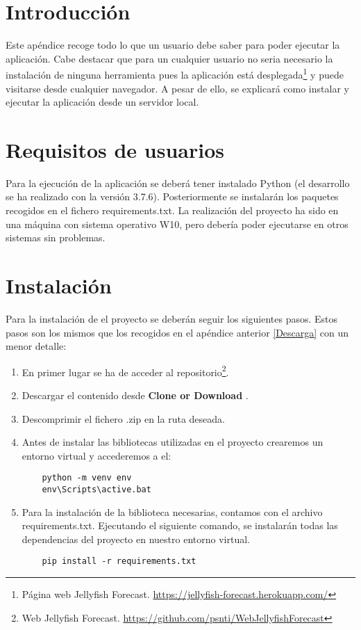 
\section{Introducción}

Este apéndice recoge todo lo que un usuario debe saber para poder ejecutar la aplicación. Cabe destacar que para un cualquier usuario no seria necesario la instalación de ninguna herramienta pues la aplicación está desplegada\footnote{Página web Jellyfish Forecast. \url{https://jellyfish-forecast.herokuapp.com/}} y puede visitarse desde cualquier navegador. A pesar de ello, se explicará como instalar y ejecutar la aplicación desde un servidor local.

\section{Requisitos de usuarios}
Para la ejecución de la aplicación se deberá tener instalado Python (el desarrollo se ha realizado con la versión 3.7.6). Posteriormente se instalarán los paquetes recogidos en el fichero requirements.txt. La realización del proyecto ha sido en una máquina con sistema operativo W10, pero debería poder ejecutarse en otros sistemas sin problemas.

\section{Instalación}

Para la instalación de el proyecto se deberán seguir los siguientes pasos. Estos pasos son los mismos que los recogidos en el apéndice anterior \ref{Descarga} con un menor detalle:

\begin{enumerate}
	\item En primer lugar se ha de acceder al repositorio\footnote{Web Jellyfish Forecast. \url{https://github.com/psnti/WebJellyfishForecast}}.
	\item Descargar el contenido desde \textbf{Clone or Download}
	\label{clone}.
	\item Descomprimir el fichero .zip en la ruta deseada.
	\item Antes de instalar las bibliotecas utilizadas en el proyecto crearemos un entorno virtual y accederemos a el:
	\begin{verbatim}
	python -m venv env
	env\Scripts\active.bat
	\end{verbatim}
	\item Para la instalación de la biblioteca necesarias, contamos con el archivo requirements.txt. Ejecutando el siguiente comando, se instalarán todas las dependencias del proyecto en  nuestro entorno virtual.
	\begin{verbatim}
	pip install -r requirements.txt
	\end{verbatim}
\end{enumerate}

